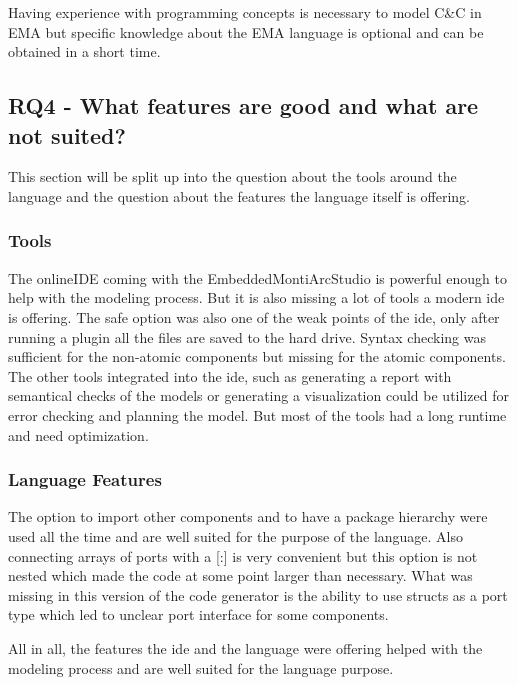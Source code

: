 Having experience with programming concepts is necessary to model C\&C in EMA but specific knowledge about the EMA language is optional and can be obtained in a short time.

\subsection{RQ4 - What features are good and what are not suited?}
This section will be split up into the question about the tools around the language and the question about the features the language itself is offering.

\subsubsection{Tools}
The onlineIDE coming with the EmbeddedMontiArcStudio is powerful enough to help with the modeling process. But it is also missing a lot of tools a modern ide is offering. The safe option was also one of the weak points of the ide, only after running a plugin all the files are saved to the hard drive. Syntax checking was sufficient for the non-atomic components but missing for the atomic components. The other tools integrated into the ide, such as generating a report with semantical checks of the models or generating a visualization could be utilized for error checking and planning the model. But most of the tools had a long runtime and need optimization.

\subsubsection{Language Features}
The option to import other components and to have a package hierarchy were used all the time and are well suited for the purpose of the language. Also connecting arrays of ports with a [:] is very convenient but this option is not nested which made the code at some point larger than necessary. What was missing in this version of the code generator is the ability to use structs as a port type which led to unclear port interface for some components.

All in all, the features the ide and the language were offering helped with the modeling process and are well suited for the language purpose.





